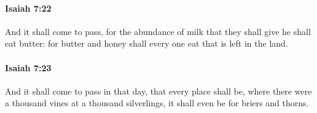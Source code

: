 		\paragraph{Isaiah 7:22} %
			\label{ISAIAH-7-22}

			And it shall come to pass, for the abundance of milk that they shall give he shall eat butter: for butter and honey shall every one eat that is left in the land.


		\paragraph{Isaiah 7:23} %
			\label{ISAIAH-7-23}

			And it shall come to pass in that day, that every place shall be, where there were a thousand vines at a thousand silverlings, it shall even be for briers and thorns.


